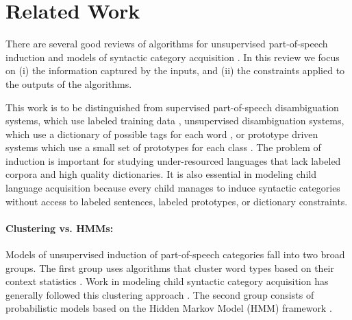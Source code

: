 \section{Related Work}
\label{sec:related}

There are several good reviews of algorithms for unsupervised
part-of-speech induction
\cite{Christodoulopoulos:2010:TDU:1870658.1870714,Gao:2008:CBE:1613715.1613761}
and models of syntactic category acquisition \cite{ambridge2011child}.
In this review we focus on (i) the information captured by the inputs,
and (ii) the constraints applied to the outputs of the algorithms.

This work is to be distinguished from supervised part-of-speech
disambiguation systems, which use labeled training data
\cite{Church:1988:SPP:974235.974260}, unsupervised disambiguation
systems, which use a dictionary of possible tags for each word
\cite{Merialdo:1994:TET:972525.972526}, or prototype driven systems
which use a small set of prototypes for each class
\cite{Haghighi:2006:PLS:1220835.1220876}.  The problem of induction is
important for studying under-resourced languages that lack labeled
corpora and high quality dictionaries.  It is also essential in
modeling child language acquisition because every child manages to
induce syntactic categories without access to labeled sentences,
labeled prototypes, or dictionary constraints.

\paragraph{Clustering vs. HMMs:}
Models of unsupervised induction of part-of-speech categories fall
into two broad groups.  The first group uses algorithms that cluster
word types based on their context statistics
\cite{Schutze:1995:DPT:976973.976994}.  Work in modeling child
syntactic category acquisition has generally followed this clustering
approach \cite{redington1998distributional,mintz2003frequent}.  The
second group consists of probabilistic models based on the Hidden
Markov Model (HMM) framework \cite{Brown:1992:CNG:176313.176316}.

